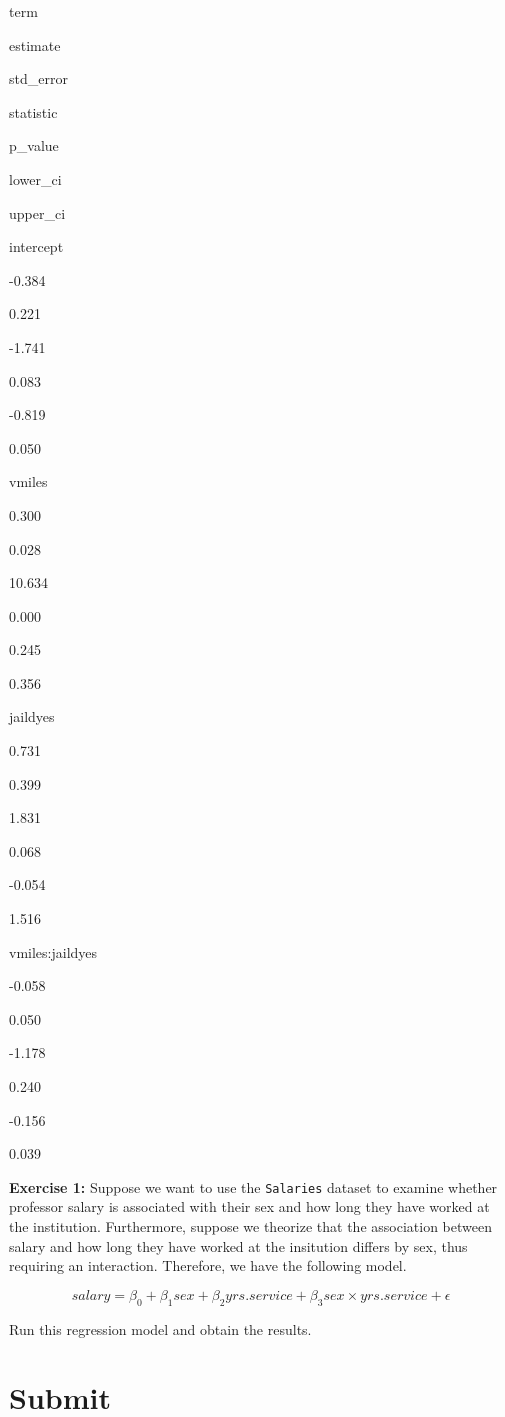 \documentclass[
]{book}
\newenvironment{learncheck}%
{%
  \par\vspace{\baselineskip}\noindent 
  \color{Exercise}\begin{itshape}%
  \par\vspace{\baselineskip}\noindent\ignorespaces 
}%
{%
  \end{itshape}\ignorespacesafterend 
}
\begin{document}
term

estimate

std\_error

statistic

p\_value

lower\_ci

upper\_ci

intercept

-0.384

0.221

-1.741

0.083

-0.819

0.050

vmiles

0.300

0.028

10.634

0.000

0.245

0.356

jaildyes

0.731

0.399

1.831

0.068

-0.054

1.516

vmiles:jaildyes

-0.058

0.050

-1.178

0.240

-0.156

0.039

\begin{learncheck}
\textbf{Exercise 1:} Suppose we want to use the \texttt{Salaries}
dataset to examine whether professor salary is associated with their sex
and how long they have worked at the institution. Furthermore, suppose
we theorize that the association between salary and how long they have
worked at the insitution differs by sex, thus requiring an interaction.
Therefore, we have the following model.

\begin{equation}
salary = \beta_0 + \beta_1sex + \beta_2yrs.service + \beta_3 sex \times yrs.service + \epsilon
\end{equation}

Run this regression model and obtain the results.
\end{learncheck}

\hypertarget{submit}{%
\section{Submit}\label{submit}}
\end{document}
